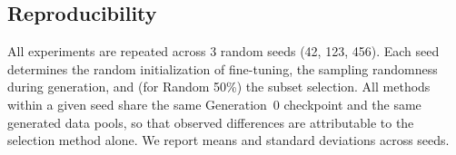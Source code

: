\subsection{Reproducibility}

All experiments are repeated across 3 random seeds (42, 123, 456). Each seed determines the random initialization of fine-tuning, the sampling randomness during generation, and (for Random 50\%) the subset selection. All methods within a given seed share the same Generation~0 checkpoint and the same generated data pools, so that observed differences are attributable to the selection method alone. We report means and standard deviations across seeds.
